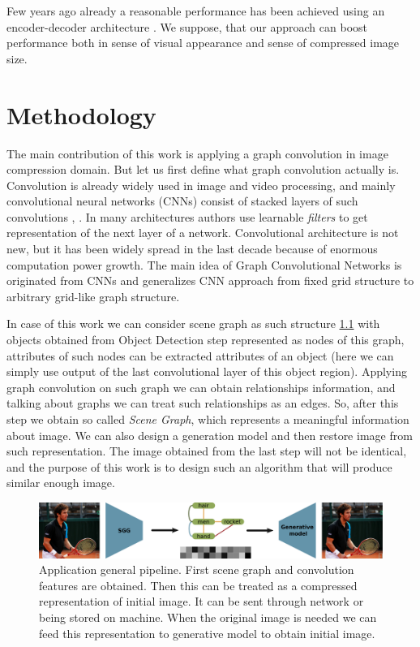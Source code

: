 Few years ago already a reasonable performance has been achieved using an encoder-decoder architecture \cite{Theis_Shi_Cunningham_Huszar_2017}. We suppose, that our approach can boost performance both in sense of visual appearance and sense of compressed image size.

\chapter{Methodology}

The main contribution of this work is applying a graph convolution in image compression domain. But let us first define what graph convolution actually is. Convolution is already widely used in image and video processing, and mainly convolutional neural networks (CNNs) consist of stacked layers of such convolutions \cite{Krizhevsky_Sutskever_Hinton_2017}, \cite{Simonyan_Zisserman_2015}. In many architectures authors use learnable \textit{filters} to get representation of the next layer of a network. Convolutional architecture is not new, but it has been widely spread in the last decade because of enormous computation power growth. The main idea of Graph Convolutional Networks is originated from CNNs and generalizes CNN approach from fixed grid structure to arbitrary grid-like graph structure.

In case of this work we can consider scene graph as such structure \ref{application-general-pipeline} with objects obtained from Object Detection step represented as nodes of this graph, attributes of such nodes can be extracted attributes of an object (here we can simply use output of the last convolutional layer of this object region). Applying graph convolution on such graph we can obtain relationships information, and talking about graphs we can treat such relationships as an edges. So, after this step we obtain so called \textit{Scene Graph}, which represents a meaningful information about image. We can also design a generation model and then restore image from such representation. The image obtained from the last step will not be identical, and the purpose of this work is to design such an algorithm that will produce similar enough image.

\begin{figure}
    \centering
    \includegraphics[width=\textwidth]{figure/application-general-pipeline.png}
    \caption{Application general pipeline. First scene graph and convolution features are obtained. Then this can be treated as a compressed representation of initial image. It can be sent through network or being stored on machine. When the original image is needed we can feed this representation to generative model to obtain initial image.}
    \label{application-general-pipeline}
\end{figure}


